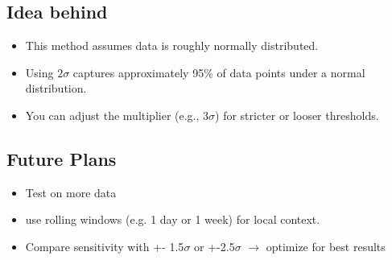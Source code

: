 \documentclass[12pt]{article}
\begin{document}
\subsubsection{}

\subsubsection{}














\newpage


\subsection{Idea behind}

\begin{itemize}
    \item This method assumes data is roughly normally distributed.
    \item Using $2\sigma$ captures approximately 95\% of data points under a normal distribution.
    \item You can adjust the multiplier (e.g., $3\sigma$) for stricter or looser thresholds.
\end{itemize}





\subsection{Future Plans}

\begin{itemize}
    \item Test on more data
    \item use rolling windows (e.g. 1 day or 1 week) for local context.
    \item Compare sensitivity with +- 1.5$\sigma$ or +-2.5$\sigma$ $\rightarrow$ optimize for best results
\end{itemize}
















\newpage
\end{document}
